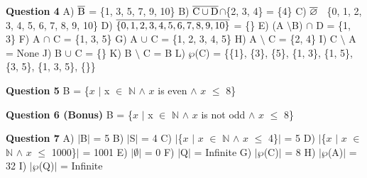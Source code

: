 \documentclass{article}
\begin{document}
\textbf{Question 4}\newline
A)	$\overline{\rm B}$ = \{1, 3, 5, 7, 9, 10\}\newline
B)	$\overline{\rm C\cup D}$$\cap$\{2, 3, 4\} = \{4\}\newline
C)	$\overline{\rm \varnothing}$ \ \{0, 1, 2, 3, 4, 5, 6, 7, 8, 9, 10\}\newline
D)	$\overline{\rm \{0, 1, 2, 3, 4 , 5, 6, 7, 8, 9 ,10\}}$ = \{\}\newline
E)	(A $\setminus$B) $\cap$ D = \{1, 3\}\newline
F)	A $\cap$ C = \{1, 3, 5\}\newline
G)	A $\cup$ C = \{1, 2, 3, 4, 5\}\newline
H)	A $\setminus$ C = \{2, 4\}\newline
I)	C $\setminus$ A = None\newline
J)	B $\cup$ C = \{\}\newline
K)	B $\setminus$ C = B\newline
L)	$\wp$(C) = \{\{1\}, \{3\}, \{5\}, \{1, 3\}, \{1, 5\}, \{3, 5\}, \{1, 3, 5\}, \{\}\}\newline\newline

\textbf{Question 5}\newline
B = \{$x$ $\mid$ x $\in$ $\mathbb{N}$ $\wedge$ $x$ is even $\wedge$ $x$ $\leq$ 8\}\newline\newline

\textbf{Question 6 (Bonus)}\newline
B = \{$x$ $\mid$ x $\in$ $\mathbb{N}$ $\wedge$ $x$ is not odd $\wedge$ $x$ $\leq$ 8\}\newline\newline

\textbf{Question 7}\newline
A)	$\mid$B$\mid$ = 5\newline
B)	$\mid$S$\mid$ = 4\newline
C)	$\mid$\{$x$ $\mid$ $x$ $\in$ $\mathbb{N}$ $\wedge$ $x$ $\leq$ 4\}$\mid$ = 5\newline
D)	$\mid$\{$x$ $\mid$ $x$ $\in$ $\mathbb{N}$ $\wedge$ $x$ $\leq$ 1000\}$\mid$ = 1001\newline
E)	$\mid$$\emptyset$$\mid$ = 0\newline
F)	$\mid$Q$\mid$ = Infinite\newline
G)	$\mid$$\wp$(C)$\mid$ = 8\newline
H)	$\mid$$\wp$(A)$\mid$ = 32\newline
I)	$\mid$$\wp$(Q)$\mid$ = Infinite\newline


\enddocument
\end{document}
